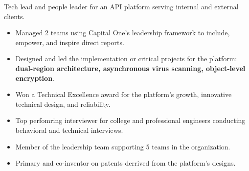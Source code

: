 \documentclass[10pt,a4paper,ragged2e,withhyper]{altacv}
\begin{document}

\makecvheader



\begin{paracol}{2}


Tech lead and people leader for an API platform serving internal and external clients.
\begin{itemize}
\item Managed 2 teams using Capital One's leadership framework to include, empower, and inspire direct reports.
\item Designed and led the implementation or critical projects for the platform: \textbf{dual-region architecture, asynchronous virus scanning, object-level encryption}.
\item Won a Technical Excellence award for the platform's growth, innovative technical design, and reliability.
\item Top perfomring interviewer for college and professional engineers conducting behavioral and technical interviews.
\item Member of the leadership team supporting 5 teams in the organization.
\item Primary and co-inventor on patents derrived from the platform's designs.
\end{itemize}


\divider{}


\end{paracol}
\end{document}
